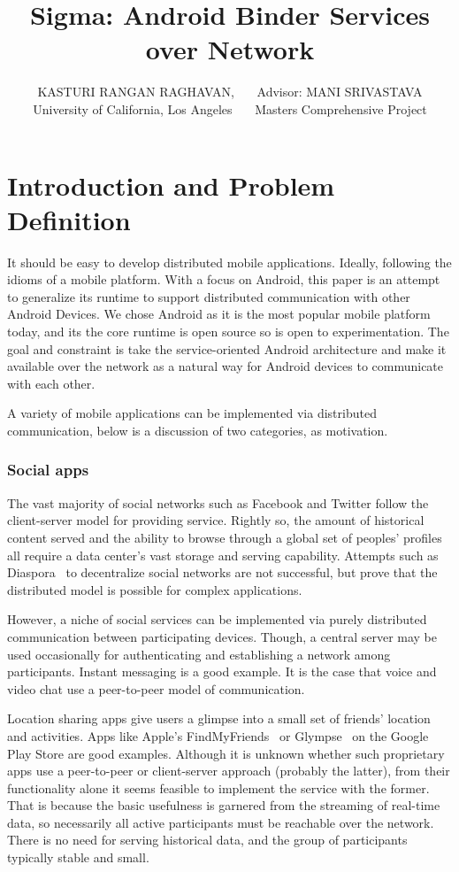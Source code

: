 \documentclass[prodmode]{acmlarge}
\title{Sigma: Android Binder Services over Network}
\author{KASTURI RANGAN RAGHAVAN,~~~
Advisor: MANI SRIVASTAVA\\ University of California, Los Angeles~~~
Masters Comprehensive Project
}
\begin{document}
\maketitle

\section{Introduction and Problem Definition}

It should be easy to develop distributed mobile applications. Ideally, following the idioms of a mobile platform. With a focus on Android, this paper is an attempt to generalize its runtime to support distributed communication with other Android Devices. We chose Android as it is the most popular mobile platform today, and its the core runtime is open source so is open to experimentation. The goal and constraint is take the service-oriented Android architecture and make it available over the network as a natural way for Android devices to communicate with each other.

A variety of mobile applications can be implemented via distributed communication, below is a discussion of two categories, as motivation.

\subsubsection{Social apps}
The vast majority of social networks such as Facebook and Twitter follow the client-server model for providing service. Rightly so, the amount of historical content served and the ability to browse through a global set of peoples' profiles all require a data center's vast storage and serving capability. Attempts such as Diaspora~\cite{Diaspora} to decentralize social networks are not successful, but prove that the distributed model is possible for complex applications.

However, a niche of social services can be implemented via purely distributed communication between participating devices. Though, a central server may be used occasionally for authenticating and establishing a network among participants. Instant messaging is a good example. It is the case that voice and video chat use a peer-to-peer model of communication.

Location sharing apps give users a glimpse into a small set of friends' location and activities. Apps like Apple's FindMyFriends~\cite{FindMyFriends} or Glympse~\cite{Glympse} on the Google Play Store are good examples. Although it is unknown whether such proprietary apps use a peer-to-peer or client-server approach (probably the latter), from their functionality alone it seems feasible to implement the service with the former. That is because the basic usefulness is garnered from the streaming of real-time data, so necessarily all active participants must be reachable over the network. There is no need for serving historical data, and the group of participants typically stable and small.
\end{document}
